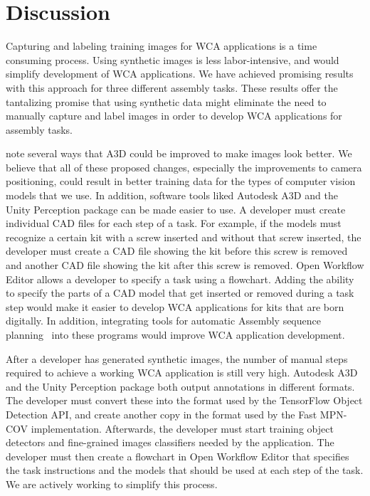 \section{Discussion}

Capturing and labeling training images for WCA applications is a time
consuming process.  Using synthetic images is less labor-intensive,
and would simplify development of WCA applications.  We have achieved
promising results with this approach for three different assembly tasks.
These results offer the tantalizing promise that
using synthetic data might eliminate the need to manually capture and label
images in order to develop WCA applications for assembly tasks.

\citet{Wang_2022_CVPR} note several ways that A3D could be improved to make
images look better.
We believe that all of these proposed changes, especially the improvements to
camera positioning, could result in better training data for the types of
computer vision models that we use.
In addition, software tools liked Autodesk A3D and the Unity Perception package
can be made easier to use.
A developer must create individual CAD files for each step of a task.
For example, if the models must recognize a certain kit with a screw
inserted and without that screw inserted, the developer must create a CAD file
showing the kit before this screw is removed and another CAD file showing the
kit after this screw is removed.
Open Workflow Editor allows a developer to specify a task using a flowchart.
Adding the ability to specify the parts of a CAD model that get inserted or
removed during a task step would make it easier to develop
WCA applications for kits that are born digitally.
In addition, integrating tools for automatic Assembly sequence
planning~\cite{subassembly_identification} into these programs would improve WCA
application development.

After a developer has generated synthetic images, the number of manual steps
required to achieve a working WCA application is still very high.
Autodesk A3D and the Unity Perception package both output annotations in
different formats.
The developer must convert these into the format used by the TensorFlow Object
Detection API, and create another copy in the format used by the Fast MPN-COV
implementation.
Afterwards, the developer must start training object detectors and fine-grained
images classifiers needed by the application.
The developer must then create a flowchart in Open Workflow Editor that
specifies the task instructions and the models that should be used at each step
of the task.
We are actively working to simplify this process.
